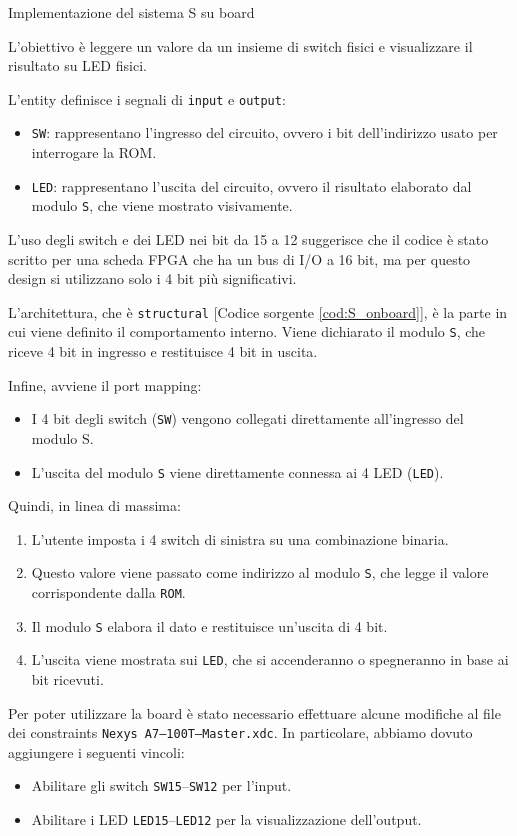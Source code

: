 \begin{code}
    \inputminted{vhdl}{vhdl/S_onboard.vhd}
    \caption{Implementazione del sistema S su board}
    \label{cod:S_onboard}
\end{code}

L'obiettivo è leggere un valore da un insieme di switch fisici e visualizzare il risultato su LED fisici. 

L'entity definisce i segnali di \texttt{input} e \texttt{output}:

\begin{itemize}
    \item \texttt{SW}: rappresentano l'ingresso del circuito, ovvero i bit dell'indirizzo usato per interrogare la ROM.
    \item \texttt{LED}: rappresentano l'uscita del circuito, ovvero il risultato elaborato dal modulo \texttt{S}, che viene mostrato visivamente.
\end{itemize}

L'uso degli switch e dei LED nei bit da 15 a 12 suggerisce che il codice è stato scritto per una scheda FPGA che ha un bus di I/O a 16 bit, ma per questo design si utilizzano solo i 4 bit più significativi.

L'architettura, che è \texttt{structural} [Codice sorgente \ref{cod:S_onboard}], è la parte in cui viene definito il comportamento interno. Viene dichiarato il modulo \texttt{S}, che riceve 4 bit in ingresso e restituisce 4 bit in uscita.

Infine, avviene il port mapping:

\begin{itemize}
    \item I 4 bit degli switch (\texttt{SW}) vengono collegati direttamente all'ingresso del modulo S.
    \item L'uscita del modulo \texttt{S} viene direttamente connessa ai 4 LED (\texttt{LED}).
\end{itemize}

Quindi, in linea di massima:

\begin{enumerate}
    \item L'utente imposta i 4 switch di sinistra su una combinazione binaria.
    \item Questo valore viene passato come indirizzo al modulo \texttt{S}, che legge il valore corrispondente dalla \texttt{ROM}.
    \item Il modulo \texttt{S} elabora il dato e restituisce un'uscita di 4 bit.
    \item L'uscita viene mostrata sui \texttt{LED}, che si accenderanno o spegneranno in base ai bit ricevuti.
\end{enumerate}

Per poter utilizzare la board è stato necessario effettuare alcune modifiche al file dei constraints \texttt{Nexys A7--100T--Master.xdc}. In particolare, abbiamo dovuto aggiungere i seguenti vincoli:
\begin{itemize}
    \item Abilitare gli switch \texttt{SW15}--\texttt{SW12} per l’input.
    \item Abilitare i LED \texttt{LED15}--\texttt{LED12} per la visualizzazione dell’output.
\end{itemize}
